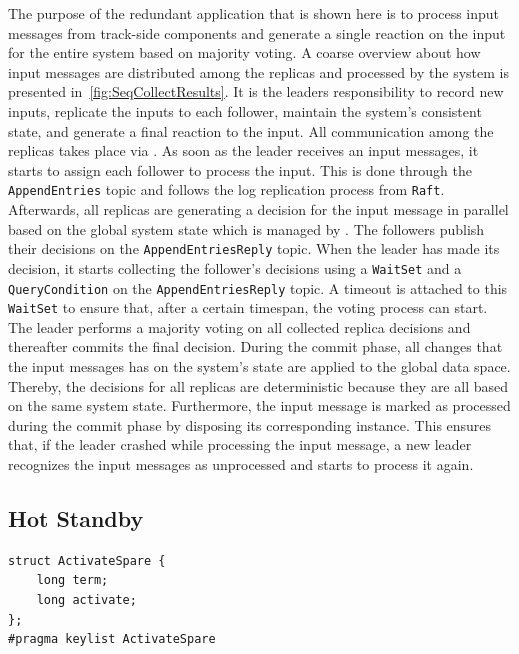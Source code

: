 The purpose of the redundant application that is shown here is to process input messages from track-side components and generate a single reaction on the input for the entire system based on majority voting.
A coarse overview about how input messages are distributed among the replicas and processed by the system is presented in~\autoref{fig:SeqCollectResults}.
It is the leaders responsibility to record new inputs, replicate the inputs to each follower, maintain the system's consistent state, and generate a final reaction to the input.
All communication among the replicas takes place via .
As soon as the leader receives an input messages, it starts to assign each follower to process the input.
This is done through the \texttt{AppendEntries} topic and follows the log replication process from \texttt{Raft}.
Afterwards, all replicas are generating a decision for the input message in parallel based on the global system state which is managed by .
The followers publish their decisions on the \texttt{AppendEntriesReply} topic.
When the leader has made its decision, it starts collecting the follower's decisions using a \texttt{WaitSet} and a \texttt{QueryCondition} on the \texttt{AppendEntriesReply} topic.
A timeout is attached to this \texttt{WaitSet} to ensure that, after a certain timespan, the voting process can start.
The leader performs a majority voting on all collected replica decisions and thereafter commits the final decision.
During the commit phase, all changes that the input messages has on the system's state are applied to the global data space.
Thereby, the decisions for all replicas are deterministic because they are all based on the same system state.
Furthermore, the input message is marked as processed during the commit phase by disposing its corresponding  instance.
This ensures that, if the leader crashed while processing the input message, a new leader recognizes the input messages as unprocessed and starts to process it again.

\subsection{Hot Standby}
\begin{lstlisting}[caption={\abr{IDL} definition for the \texttt{ActivateSpare} topic. This topic is used to activate or deactivate spare replicas. The \texttt{term} field encodes the term in which the activate or deactivate call has been made and \texttt{activate} gets interpreted as a boolean that encodes whether the spare should be activated or deactivated.}, label=code:activateSpare]
struct ActivateSpare {
    long term;
    long activate;
};
#pragma keylist ActivateSpare
\end{lstlisting}

